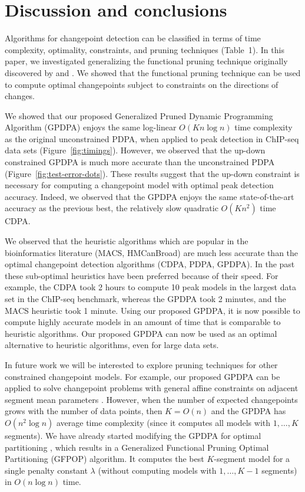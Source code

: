 \documentclass[aoas]{imsart}
\begin{document}
\section{Discussion and conclusions}
\label{sec:discussion}

Algorithms for changepoint detection can be classified in terms of
time complexity, optimality, constraints, and pruning techniques
(Table~1). In this paper, we investigated generalizing the functional
pruning technique originally discovered by \citet{pruned-dp} and
\citet{phd-johnson}. We showed that the functional pruning technique can
be used to compute optimal changepoints subject to constraints
on the directions of changes.

We showed that our proposed Generalized Pruned Dynamic Programming
Algorithm (GPDPA) enjoys the same log-linear $O(Kn\log n)$ time
complexity as the original unconstrained PDPA, when applied to peak
detection in ChIP-seq data sets (Figure~\ref{fig:timings}). However,
we observed that the up-down constrained GPDPA is much more accurate
than the unconstrained PDPA (Figure~\ref{fig:test-error-dots}). These
results suggest that the up-down constraint is necessary for computing
a changepoint model with optimal peak detection accuracy. Indeed, we
observed that the GPDPA enjoys the same state-of-the-art accuracy as
the previous best, the relatively slow quadratic $O(Kn^2)$ time
CDPA.

We observed that the heuristic algorithms which are popular in the
bioinformatics literature (MACS, HMCanBroad) are much less accurate
than the optimal changepoint detection algorithms (CDPA, PDPA,
GPDPA). In the past these sub-optimal heuristics have been preferred
because of their speed. For example, the CDPA took 2 hours to compute
10 peak models in the largest data set in the ChIP-seq benchmark,
whereas the GPDPA took 2 minutes, and the MACS heuristic took 1
minute. Using our proposed GPDPA, it is now possible to compute highly
accurate models in an amount of time that is comparable to heuristic
algorithms. Our proposed GPDPA can now be used as an optimal
alternative to heuristic algorithms, even for large data sets.

In future work we will be interested to explore pruning techniques for
other constrained changepoint models. For example, our proposed GPDPA can be
applied to solve changepoint problems with general affine constraints
on adjacent segment mean parameters
\citep{Hocking-constrained-changepoint-detection}. However, when the number of
expected changepoints grows with the number of data points, then
$K=O(n)$ and the GPDPA has $O(n^2 \log n)$ average time
complexity (since it computes all models with $1,\dots,K$
segments). We have already started modifying the GPDPA for optimal
partitioning \citep{optimal-partitioning}, which results in a
Generalized Functional Pruning Optimal Partitioning (GFPOP)
algorithm. It computes the best $K$-segment model for a single penalty
constant $\lambda$ (without computing models with $1,\dots,K-1$
segments) in $O(n\log n)$ time.
\end{document}

